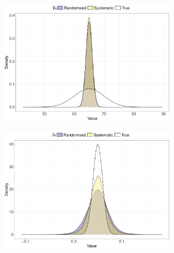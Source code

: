 \documentclass[a4paper]{article} 	%
\begin{document}
\begin{figure}[!htp]
    \centering
    \begin{subfigure}[b]{0.32\textwidth}
        \centering
        \includegraphics[width=\textwidth]{density_mat_1k_b0.pdf}
        \label{fig:beta0_mat}
    \end{subfigure}
    \hfill
    \begin{subfigure}[b]{0.32\textwidth}
        \centering
        \includegraphics[width=\textwidth]{density_mat_1k_b1.pdf}
        \label{fig:beta1_mat}
    \end{subfigure}
    \hfill
    \begin{subfigure}[b]{0.32\textwidth}
        \centering

\end{subfigure}
\end{figure}
\end{document}
